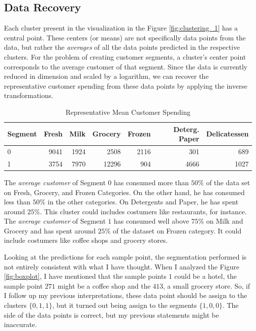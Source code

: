 \documentclass[a4paper]{article}
\begin{document}
\subsection{Data Recovery}

Each cluster present in the visualization in the Figure \ref{fig:clustering_1} has a central point. These centers (or means) are not specifically data points from the data, but rather the \textit{averages} of all the data points predicted in the respective clusters. For the problem of creating customer segments, a cluster's center point corresponds to the average customer of that segment. Since the data is currently reduced in dimension and scaled by a logarithm, we can recover the representative customer spending from these data points by applying the inverse transformations.


\begin{table}[ht!]
\centering
\begin{tabular}{l|rrrrrr}
{Segment} &  Fresh &  Milk &  Grocery &  Frozen &  Deterg. Paper &  Delicatessen \\\hline
0 &   9041 &  1924 &     2508 &    2116 &               301 &           689 \\
1 &   3754 &  7970 &    12296 &     904 &              4666 &          1027 \\

\end{tabular}
\caption{\label{tab:centrois_Recov}Representative Mean Customer Spending}
\end{table}

The \textit{average customer} of Segment $0$ has consumed more than $50\%$ of the data set on Fresh, Grocery, and Frozen Categories. On the other hand, he has consumed less than $50\%$ in the other categories. On Detergents and Paper, he has spent around $25\%$. This cluster could includes costumers like restaurants, for instance. The \textit{average customer} of Segment $1$ has consumed well above $75\%$ on Milk and Grocery and has spent around $25\%$ of the dataset on Frozen category. It could include costumers like coffee shops and grocery stores.

Looking at the predictions for each sample point, the segmentation performed is not entirely consistent with what I have thought. When I analyzed the Figure \ref{fig:boxplot}, I have mentioned that the sample points $1$ could be a hotel, the sample point $271$ might be a coffee shop and the $413$, a small grocery store. So, if I follow up my previous interpretations, these data point should be assign to the clusters $\{ 0, 1, 1\}$, but it turned out being assign to the segments $\{ 1, 0, 0\}$. The side of the data points is correct, but my previous statements might be inaccurate.
\end{document}
